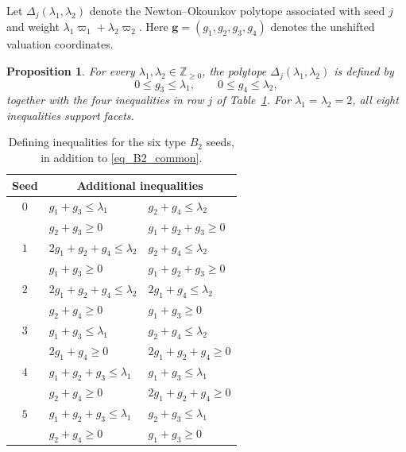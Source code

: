 \documentclass[10pt]{amsart}
\numberwithin{equation}{section}
\theoremstyle{plain}
\newtheorem{proposition}[theorem]{Proposition}
\theoremstyle{definition}
\theoremstyle{remark}
\begin{document}
Let $\Delta_j(\lambda_1,\lambda_2)$ denote the Newton--Okounkov polytope
associated with seed $j$ and weight $\lambda_1 \varpi_1+ \lambda_2 \varpi_2$.
Here $\mathbf g=(g_1,g_2,g_3,g_4)$ denotes the unshifted
valuation coordinates. 

\begin{proposition}\label{prop_B2_inequalities}
	For every $\lambda_1, \lambda_2 \in\mathbb Z_{\geq0}$, the polytope
	$\Delta_j(\lambda_1, \lambda_2)$ is defined by
	\begin{equation}\label{eq_B2_common}
		0\leq g_3\leq \lambda_1,\qquad 0\leq g_4\leq \lambda_2,
	\end{equation}
	together with the four inequalities in row $j$ of
	Table~\ref{tab_B2_inequalities}.
	For $\lambda_1=\lambda_2=2$, all eight inequalities support facets.
\end{proposition}

\begin{table}[ht]
	\centering
	\begin{tabular}{c|ll}
		\toprule
		Seed & \multicolumn{2}{c}{Additional inequalities} \\
		\midrule
		$0$ & $g_1+g_3\leq \lambda_1$ & $g_2+g_4\leq \lambda_2$ \\
		& $g_2+g_3\geq0$ & $g_1+g_2+g_3\geq0$ \\
		\midrule
		$1$ & $2g_1+g_2+g_4\leq \lambda_2$ & $g_2+g_4\leq \lambda_2$ \\
		& $g_1+g_3\geq0$ & $g_1+g_2+g_3\geq0$ \\
		\midrule
		$2$ & $2g_1+g_2+g_4\leq \lambda_2$ & $2g_1+g_4\leq \lambda_2$ \\
		& $g_2+g_4\geq0$ & $g_1+g_3\geq0$ \\
		\midrule
		$3$ & $g_1+g_3\leq \lambda_1$ & $g_2+g_4\leq \lambda_2$ \\
		& $2g_1+g_4\geq0$ & $2g_1+g_2+g_4\geq0$ \\
		\midrule
		$4$ & $g_1+g_2+g_3\leq \lambda_1$ & $g_1+g_3\leq \lambda_1$ \\
		& $g_2+g_4\geq0$ & $2g_1+g_2+g_4\geq0$ \\
		\midrule
		$5$ & $g_1+g_2+g_3\leq \lambda_1$ & $g_2+g_3\leq \lambda_1$ \\
		& $g_2+g_4\geq0$ & $g_1+g_3\geq0$ \\
		\bottomrule
	\end{tabular}
	\caption{Defining inequalities for the six type $B_2$ seeds,
		in addition to \eqref{eq_B2_common}.}
	\label{tab_B2_inequalities}
\end{table}
\end{document}
